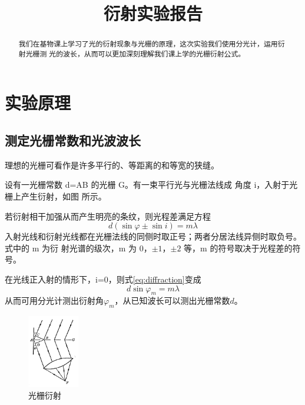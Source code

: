 \documentclass{ctexart}
\title{衍射实验报告}
\begin{document}
\maketitle

\begin{abstract}
  我们在基物课上学习了光的衍射现象与光栅的原理，这次实验我们使用分光计，运用衍射光栅测
  光的波长，从而可以更加深刻理解我们课上学的光栅衍射公式。
\end{abstract}

\section{实验原理}
  \subsection{测定光栅常数和光波波长}
    理想的光栅可看作是许多平行的、等距离的和等宽的狭缝。

    设有一光栅常数 d=AB 的光栅 G。有一束平行光与光栅法线成
    角度 i，入射于光栅上产生衍射，如图 所示。

    若衍射相干加强从而产生明亮的条纹，则光程差满足方程
    \begin{equation}\label{eq:diffraction}
      d (\sin{\varphi} \pm \sin{i}) = m\lambda 
    \end{equation}
    入射光线和衍射光线都在光栅法线的同侧时取正号；两者分居法线异侧时取负号。式中的 m 为衍
    射光谱的级次，m 为 0，$\pm1$，$\pm2$ 等，m 的符号取决于光程差的符号。

    在光线正入射的情形下，i=0，则式\eqref{eq:diffraction}变成
    \begin{equation}
      d \sin{\varphi_m} = m\lambda
    \end{equation}
    从而可用分光计测出衍射角$\varphi_m$，从已知波长可以测出光栅常数$d$。
    \begin{figure}[htbp]
      \centering
      \includegraphics[width=0.2\textwidth,height=0.25\textwidth]{图片.png}
      \caption{光栅衍射}
      \end{figure} 
\end{document}
